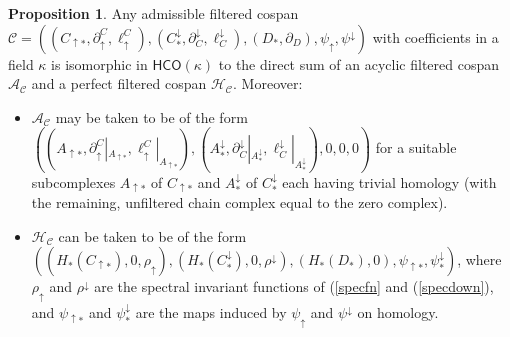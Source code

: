 \documentclass[11pt]{amsart}
\theoremstyle{definition}
\newtheorem{prop}[theorem]{Proposition}
\theoremstyle{remark}
\numberwithin{equation}{section}
\begin{document}
\begin{prop}\label{coah} 
	Any admissible filtered cospan $\mathcal{C}=\left((C_{\uparrow *},\partial_{\uparrow}^C,\ell_{\uparrow}^C),(C^{\downarrow}_{*},\partial^{\downarrow}_C,\ell^{\downarrow}_C),(D_*,\partial_D),\psi_{\uparrow},\psi^{\downarrow}\right)$ with coefficients in a field $\kappa$ is isomorphic in $\mathsf{HCO}(\kappa)$ to the direct sum of an acyclic filtered cospan $\mathcal{A}_{\mathcal{C}}$ and a perfect filtered cospan $\mathcal{H}_{\mathcal{C}}$.  Moreover:\begin{itemize}
		\item $\mathcal{A}_{\mathcal{C}}$ may be taken to be of the form $((A_{\uparrow *},\partial_{\uparrow}^{C}|_{A_{\uparrow *}},\ell_{\uparrow}^{C}|_{A_{\uparrow *}}),(A^{\downarrow}_{*},\partial^{\downarrow}_{C}|_{A^{\downarrow}_{*}},\ell^{\downarrow}_{C}|_{A^{\downarrow}_{*}}),0,0,0)$ for a suitable subcomplexes $A_{\uparrow *}$ of $C_{\uparrow *}$ and $A^{\downarrow}_{*}$ of $C^{\downarrow}_{*}$ each having trivial homology (with the remaining, unfiltered chain complex equal to the zero complex).
		\item $\mathcal{H}_{\mathcal{C}}$ can be taken to be of the form $\left((H_*(C_{\uparrow *}),0,\rho_{\uparrow}),(H_*(C^{\downarrow}_{*}),0,\rho^{\downarrow}),(H_*(D_*),0),\psi_{\uparrow *},\psi^{\downarrow}_{*}\right)$, where $\rho_{\uparrow}$ and $\rho^{\downarrow}$ are the spectral invariant functions of (\ref{specfn} and (\ref{specdown}), and $\psi_{\uparrow *}$ and $\psi^{\downarrow}_{*}$ are the maps induced by $\psi_{\uparrow}$ and $\psi^{\downarrow}$ on homology. \end{itemize}
\end{prop}
\end{document}
